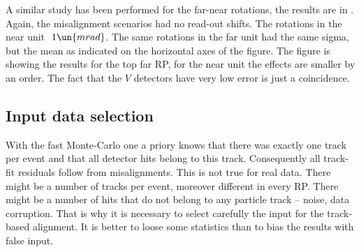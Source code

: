 
A similar study has been performed for the far-near rotations, the results are in . Again, the misalignment scenarios had no read-out shifts. The rotations in the near unit $~1\un{mrad}$. The same rotations in the far unit had the same sigma, but the mean as indicated on the horizontal axes of the figure. The figure is showing the results for the top far RP, for the near unit the effects are smaller by an order. The fact that the $V$ detectors have very low error is just a coincidence.




\subsection[al data sel]{Input data selection}

With the fast Monte-Carlo one a priory knows that there was exactly one track per event and that all detector hits belong to this track. Consequently all track-fit residuals follow from misalignments. This is not true for real data. There might be a number of tracks per event, moreover different in every RP. There might be a number of hits that do not belong to any particle track -- noise, data corruption. That is why it is necessary to select carefully the input for the track-based alignment. It is better to loose some statistics than to bias the results with false input.

